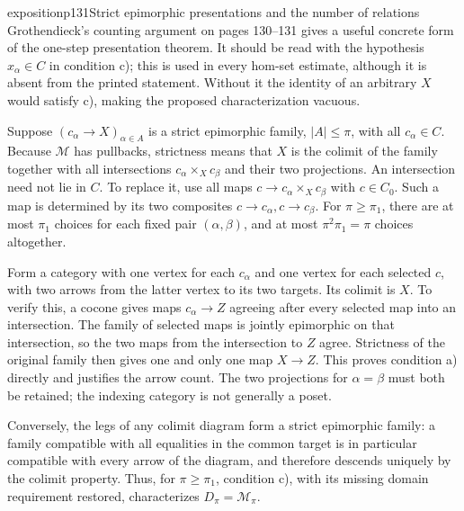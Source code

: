 \begin{dcomment}{exposition}{p131}{Strict epimorphic presentations and the number of relations}
Grothendieck's counting argument on pages 130--131 gives a useful concrete form of the one-step presentation theorem. It should be read with the hypothesis $x_\alpha\in C$ in condition c); this is used in every hom-set estimate, although it is absent from the printed statement. Without it the identity of an arbitrary $X$ would satisfy c), making the proposed characterization vacuous.

Suppose $(c_\alpha\to X)_{\alpha\in A}$ is a strict epimorphic family, $|A|\leq\pi$, with all $c_\alpha\in C$. Because $\mathcal M$ has pullbacks, strictness means that $X$ is the colimit of the family together with all intersections $c_\alpha\times_Xc_\beta$ and their two projections. An intersection need not lie in $C$. To replace it, use all maps $c\to c_\alpha\times_Xc_\beta$ with $c\in C_0$. Such a map is determined by its two composites $c\to c_\alpha,c\to c_\beta$. For $\pi\geq\pi_1$, there are at most $\pi_1$ choices for each fixed pair $(\alpha,\beta)$, and at most $\pi^2\pi_1=\pi$ choices altogether.

Form a category with one vertex for each $c_\alpha$ and one vertex for each selected $c$, with two arrows from the latter vertex to its two targets. Its colimit is $X$. To verify this, a cocone gives maps $c_\alpha\to Z$ agreeing after every selected map into an intersection. The family of selected maps is jointly epimorphic on that intersection, so the two maps from the intersection to $Z$ agree. Strictness of the original family then gives one and only one map $X\to Z$. This proves condition a) directly and justifies the arrow count. The two projections for $\alpha=\beta$ must both be retained; the indexing category is not generally a poset.

Conversely, the legs of any colimit diagram form a strict epimorphic family: a family compatible with all equalities in the common target is in particular compatible with every arrow of the diagram, and therefore descends uniquely by the colimit property. Thus, for $\pi\geq\pi_1$, condition c), with its missing domain requirement restored, characterizes $D_\pi=\mathcal M_\pi$.


\end{dcomment}
